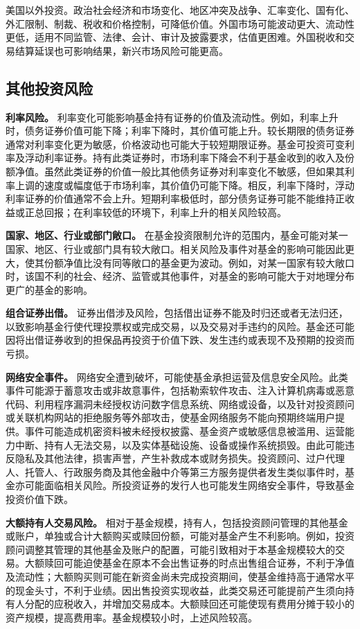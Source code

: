 \documentclass[UTF8,fontset=none,11pt,a4paper]{ctexart}
\begin{document}
美国以外投资。政治社会经济和市场变化、地区冲突及战争、汇率变化、国有化、外汇限制、制裁、税收和价格控制，可降低价值。外国市场可能波动更大、流动性更低，适用不同监管、法律、会计、审计及披露要求，估值更困难。外国税收和交易结算延误也可影响结果，新兴市场风险可能更高。


\subsection*{其他投资风险}
\textbf{利率风险。} 利率变化可能影响基金持有证券的价值及流动性。例如，利率上升时，债务证券价值可能下降；利率下降时，其价值可能上升。较长期限的债务证券通常对利率变化更为敏感，价格波动也可能大于较短期限证券。基金可投资可变利率及浮动利率证券。持有此类证券时，市场利率下降会不利于基金收到的收入及份额净值。虽然此类证券的价值一般比其他债务证券对利率变化不敏感，但如果其利率上调的速度或幅度低于市场利率，其价值仍可能下降。相反，利率下降时，浮动利率证券的价值通常不会上升。短期利率极低时，部分债务证券可能不能维持正收益或正总回报；在利率较低的环境下，利率上升的相关风险较高。


\textbf{国家、地区、行业或部门敞口。} 在基金投资限制允许的范围内，基金可能对某一国家、地区、行业或部门具有较大敞口。相关风险及事件对基金的影响可能因此更大，使其份额净值比没有同等敞口的基金更为波动。例如，对某一国家有较大敞口时，该国不利的社会、经济、监管或其他事件，对基金的影响可能大于对地理分布更广的基金的影响。


\textbf{组合证券出借。} 证券出借涉及风险，包括借出证券不能及时归还或者无法归还，以致影响基金行使代理投票权或完成交易，以及交易对手违约的风险。基金还可能因将出借证券收到的担保品再投资于价值下跌、发生违约或表现不及预期的投资而亏损。


\textbf{网络安全事件。} 网络安全遭到破坏，可能使基金承担运营及信息安全风险。此类事件可能源于蓄意攻击或非故意事件，包括勒索软件攻击、注入计算机病毒或恶意代码、利用程序漏洞未经授权访问数字信息系统、网络或设备，以及针对投资顾问或关联机构网站的拒绝服务等外部攻击，使基金网络服务不能向预期终端用户提供。事件可能造成机密资料被未经授权披露、基金资产或敏感信息被滥用、运营能力中断、持有人无法交易，以及实体基础设施、设备或操作系统损毁。由此可能违反隐私及其他法律，损害声誉，产生补救成本或财务损失。投资顾问、过户代理人、托管人、行政服务商及其他金融中介等第三方服务提供者发生类似事件时，基金亦可能面临相关风险。所投资证券的发行人也可能发生网络安全事件，导致基金投资价值下跌。


\textbf{大额持有人交易风险。} 相对于基金规模，持有人，包括投资顾问管理的其他基金或账户，单独或合计大额购买或赎回份额，可能对基金产生不利影响。例如，投资顾问调整其管理的其他基金及账户的配置，可能引致相对于本基金规模较大的交易。大额赎回可能迫使基金在原本不会出售证券的时点出售组合证券，不利于净值及流动性；大额购买则可能在新资金尚未完成投资期间，使基金维持高于通常水平的现金头寸，不利于业绩。因出售投资实现收益，此类交易还可能提前产生须向持有人分配的应税收入，并增加交易成本。大额赎回还可能使现有费用分摊于较小的资产规模，提高费用率。基金规模较小时，上述风险较高。
\end{document}
